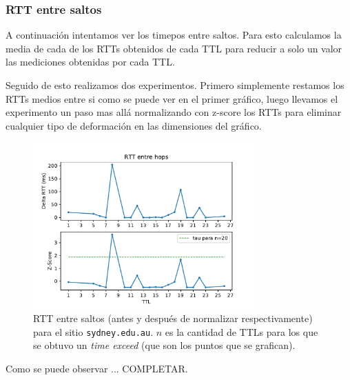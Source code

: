 \subsubsection*{RTT entre saltos}

A continuación intentamos ver los timepos entre saltos. Para esto calculamos la media de cada de los RTTs obtenidos de cada TTL para reducir a solo un valor las mediciones obtenidas por cada TTL. 

Seguido de esto realizamos dos experimentos. Primero simplemente restamos los RTTs medios entre si como se puede ver en el primer gráfico, luego llevamos el experimento un paso mas allá normalizando con z-score los RTTs para eliminar cualquier tipo de deformación en las dimensiones del gráfico.

\begin{figure}[H]
  \centering
  \includegraphics[width=8.5cm]{figs/traceroute-sidney.pdf}
  \caption{\footnotesize RTT entre saltos (antes y después de normalizar respectivamente) para el sitio \texttt{sydney.edu.au}. $n$ es la cantidad de TTLs para los que se obtuvo un \emph{time exceed} (que son los puntos que se grafican).}
\end{figure}

Como se puede observar ... COMPLETAR.
